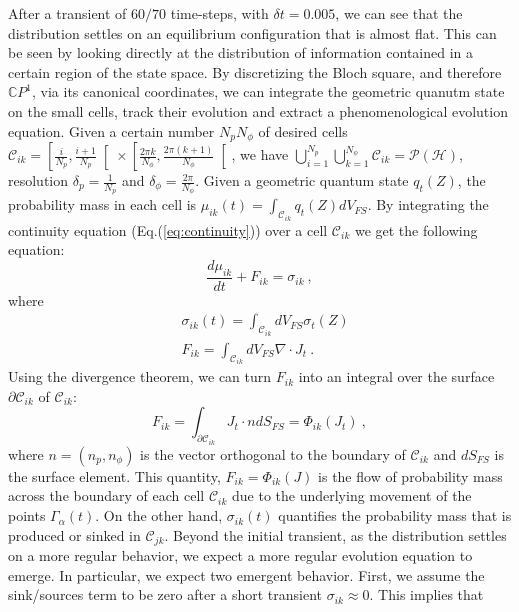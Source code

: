 \documentclass[draft,nofootinbib,pre,twocolumn,showpacs,showkeys,preprintnumbers,floatfix]{revtex4-1}
\newcommand{\CC}[2]{\mathcal{C}_{#1 #2}}
\newcommand{\1}{\mathbbm{1}}
\newcommand{\PH}{\mathcal{P}(\mathcal{H})}
\begin{document}
After a transient of $60/70$ time-steps, with $\delta t = 0.005$, we can see that the distribution
settles on an equilibrium configuration that is almost flat. This can be seen by looking
directly at the distribution of information contained in a certain region of the state space.
By discretizing the Bloch square, and therefore $\mathbb{C}P^1$, via its canonical coordinates,
we can integrate the geometric quanutm state on the small cells, track their evolution and
extract a phenomenological evolution equation. 
Given a certain number $N_p N_\phi$ of desired cells  $\mathcal{C}_{ik} = \left[ \frac{i}{N_p}, \frac{i+1}{N_p}\right[ \times \left[ \frac{2\pi k}{N_{\phi}},\frac{2\pi (k+1)}{N_{\phi}}\right[$,
we have $\bigcup_{i=1}^{N_p}\bigcup_{k=1}^{N_{\phi}}\mathcal{C}_{ik} = \PH$, resolution $\delta_p = \frac{1}{N_p}$ and
$\delta_\phi = \frac{2\pi}{N_\phi}$.
Given a geometric quantum state $q_t(Z)$, the probability mass in each cell is $\mu_{ik}(t) = \int_{\mathcal{C}_{ik}}q_t(Z) dV_{FS}$.
By integrating the continuity equation (Eq.(\ref{eq:continuity})) over a cell $\mathcal{C}_{ik}$
we get the following equation:
\begin{equation}
\frac{d\mu_{ik}}{dt} + F_{ik} = \sigma_{ik}~,
\end{equation}
where
\begin{align}
&\sigma_{ik}(t) = \int_{\mathcal{C}_{ik}} \!\!\! dV_{FS} \sigma_t(Z)  \\
&F_{ik} = \int_{\mathcal{C}_{ik}} \!\!\! dV_{FS} \nabla \cdot J_t~.
\end{align}
Using the divergence theorem, we can turn $F_{ik}$ into an integral
over the surface $\partial \CC{i}{k}$ of $\CC{i}{k}$:
\begin{equation}
F_{ik} = \int_{\partial \mathcal{C}_{ik}} \!\!\!  J_t \cdot n dS_{FS} = \Phi_{ik}(J_t)~,
\end{equation}
where $n=(n_p,n_\phi)$ is the vector orthogonal to the boundary of $\CC{i}{k}$
and $dS_{FS}$ is the surface element. This quantity, $F_{ik}=\Phi_{ik}(J)$ is 
the flow of probability mass across the boundary of each cell $\CC{i}{k}$
due to the underlying movement of the points $\Gamma_\alpha(t)$. On the other
hand, $\sigma_{ik}(t)$ quantifies the probability mass that is produced or sinked
in $\CC{j}{k}$. Beyond the initial transient, as the distribution settles on a more
regular behavior, we expect a more regular evolution equation to emerge. In
particular, we expect two emergent behavior. First, we assume the sink/sources
term to be zero after a short transient $\sigma_{ik} \approx 0$. This implies that
\end{document}
